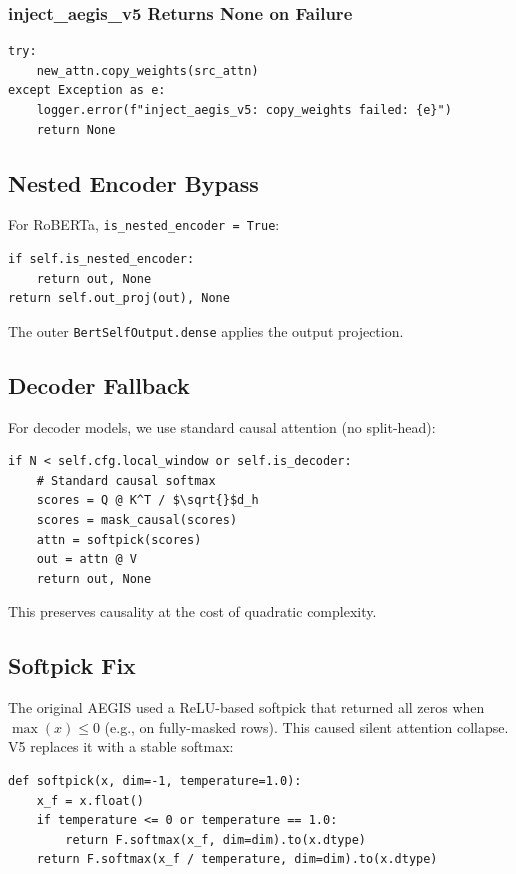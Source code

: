\subsubsection{inject\_aegis\_v5 Returns None on Failure}

\begin{lstlisting}
try:
    new_attn.copy_weights(src_attn)
except Exception as e:
    logger.error(f"inject_aegis_v5: copy_weights failed: {e}")
    return None
\end{lstlisting}

\subsection{Nested Encoder Bypass}

For RoBERTa, \texttt{is\_nested\_encoder = True}:

\begin{lstlisting}
if self.is_nested_encoder:
    return out, None
return self.out_proj(out), None
\end{lstlisting}

The outer \texttt{BertSelfOutput.dense} applies the output projection.

\subsection{Decoder Fallback}

For decoder models, we use standard causal attention (no split-head):

\begin{lstlisting}
if N < self.cfg.local_window or self.is_decoder:
    # Standard causal softmax
    scores = Q @ K^T / $\sqrt{}$d_h
    scores = mask_causal(scores)
    attn = softpick(scores)
    out = attn @ V
    return out, None
\end{lstlisting}

This preserves causality at the cost of quadratic complexity.

\subsection{Softpick Fix}

The original AEGIS used a ReLU-based softpick that returned all zeros when 
$\max(x) \leq 0$ (e.g., on fully-masked rows). This caused silent attention 
collapse. V5 replaces it with a stable softmax:

\begin{lstlisting}
def softpick(x, dim=-1, temperature=1.0):
    x_f = x.float()
    if temperature <= 0 or temperature == 1.0:
        return F.softmax(x_f, dim=dim).to(x.dtype)
    return F.softmax(x_f / temperature, dim=dim).to(x.dtype)
\end{lstlisting}

